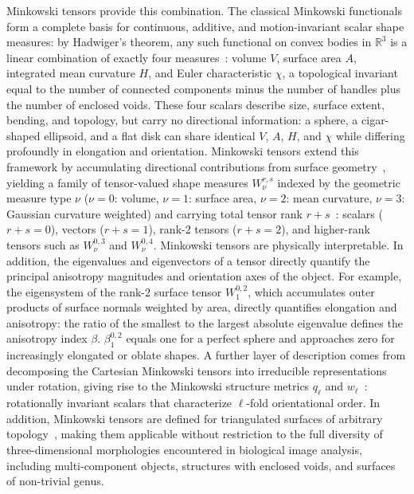 \documentclass[times, twoside, watermark]{zHenriquesLab-StyleBioRxiv}
\begin{document}
Minkowski tensors provide this combination.
The classical Minkowski functionals form a complete basis for continuous, additive, and motion-invariant scalar shape measures: by Hadwiger's theorem, any such functional on convex bodies in $\mathbb{R}^3$ is a linear combination of exactly four measures~\cite{Hadwiger1957}: volume $V$, surface area $A$, integrated mean curvature $H$, and Euler characteristic $\chi$, a topological invariant equal to the number of connected components minus the number of handles plus the number of enclosed voids.
These four scalars describe size, surface extent, bending, and topology, but carry no directional information: a sphere, a cigar-shaped ellipsoid, and a flat disk can share identical $V$, $A$, $H$, and $\chi$ while differing profoundly in elongation and orientation.
Minkowski tensors extend this framework by accumulating directional contributions from surface geometry~\cite{SchroderTurk2013}, yielding a family of tensor-valued shape measures $W_\nu^{r,s}$ indexed by the geometric measure type $\nu$ ($\nu=0$: volume, $\nu=1$: surface area, $\nu=2$: mean curvature, $\nu=3$: Gaussian curvature weighted) and carrying total tensor rank $r+s$~\cite{SchroderTurk2013}: scalars ($r+s=0$), vectors ($r+s=1$), rank-2 tensors ($r+s=2$), and higher-rank tensors such as $W_\nu^{0,3}$ and $W_\nu^{0,4}$.
Minkowski tensors are physically interpretable. In addition, the eigenvalues and eigenvectors of a tensor directly quantify the principal anisotropy magnitudes and orientation axes of the object.
For example, the eigensystem of the rank-2 surface tensor $W_1^{0,2}$, which accumulates outer products of surface normals weighted by area, directly quantifies elongation and anisotropy: the ratio of the smallest to the largest absolute eigenvalue defines the anisotropy index $\beta$.
$\beta_1^{0,2}$ equals one for a perfect sphere and approaches zero for increasingly elongated or oblate shapes.
A further layer of description comes from decomposing the Cartesian Minkowski tensors into irreducible representations under rotation, giving rise to the Minkowski structure metrics $q_\ell$ and $w_\ell$~\cite{Steinhardt1983, Mickel2013}: rotationally invariant scalars that characterize $\ell$-fold orientational order.
In addition, Minkowski tensors are defined for triangulated surfaces of arbitrary topology~\cite{SchroderTurk2013}, making them applicable without restriction to the full diversity of three-dimensional morphologies encountered in biological image analysis, including multi-component objects, structures with enclosed voids, and surfaces of non-trivial genus.
\end{document}
